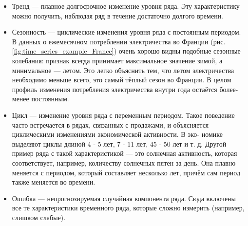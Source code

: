\begin{itemize}
    \item Тренд — плавное долгосрочное изменение уровня ряда. Эту характеристику можно получить, наблюдая
    ряд в течение достаточно долгого времени.
    \item Сезонность — циклические изменения уровня ряда с постоянным периодом. В данных о ежемесячном 
    потреблении электричества во Франции (рис. \ref{fig:time_series_example_France}) очень хорошо видны подобные 
    сезонные колебания: признак всегда принимает максимальное значение зимой, а минимальное — летом. 
    Это легко объяснить тем, что летом электричества необходимо меньше всего, это самый тёплый сезон 
    во Франции. В целом профиль изменения потребления электричества внутри года остаётся более-менее 
    постоянным.
    \item Цикл — изменение уровня ряда с переменным периодом. Такое поведение часто встречается в рядах,
    связанных с продажами, и объясняется циклическими изменениями экономической активности. В эко-
    номике выделяют циклы длиной 4 - 5 лет, 7 - 11 лет, 45 - 50 лет и т. д. Другой пример ряда с такой
    характеристикой — это солнечная активность, которая соответствует, например, количеству солнечных
    пятен за день. Она плавно меняется с периодом, который составляет несколько лет, причём сам период
    также меняется во времени.
    \item Ошибка — непрогнозируемая случайная компонента ряда. Сюда включены все те характеристики временного ряда, 
    которые сложно измерить (например, слишком слабые).
\end{itemize}



